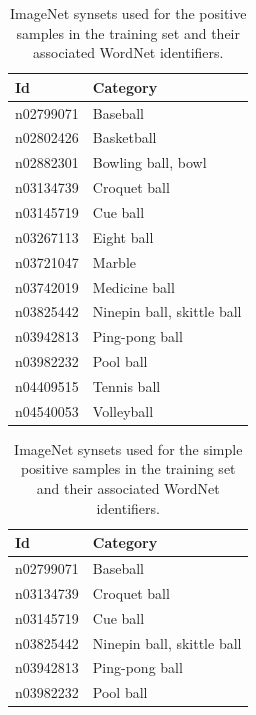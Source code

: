 \documentclass{llncs}
\begin{document}
{{			\begin{table}
				\centering
				\caption{ImageNet synsets used for the positive samples in the training set and their associated WordNet identifiers.}
				\label{tab:positive_samples}
				\begin{tabularx}{\textwidth}{@{}lX@{}}
					\toprule
					\textbf{Id} & \textbf{Category} \\
					\midrule
						n02799071 & Baseball \\
						n02802426 & Basketball \\
						n02882301 & Bowling ball, bowl \\
						n03134739 & Croquet ball \\
						n03145719 & Cue ball \\
						n03267113 & Eight ball \\
						n03721047 & Marble \\
						n03742019 & Medicine ball \\
						n03825442 & Ninepin ball, skittle ball \\
						n03942813 & Ping-pong ball \\
						n03982232 & Pool ball \\
						n04409515 & Tennis ball \\
						n04540053 & Volleyball \\
					\bottomrule
				\end{tabularx}
			\end{table}

			\begin{table}
				\centering
				\caption{ImageNet synsets used for the simple positive samples in the training set and their associated WordNet identifiers.}
				\label{tab:positive_samples_simple}
				\begin{tabularx}{\textwidth}{@{}lX@{}}
					\toprule
					\textbf{Id} & \textbf{Category} \\
					\midrule
						n02799071 & Baseball \\
						n03134739 & Croquet ball \\
						n03145719 & Cue ball \\
						n03825442 & Ninepin ball, skittle ball \\
						n03942813 & Ping-pong ball \\
						n03982232 & Pool ball \\
					\bottomrule
				\end{tabularx}
			\end{table}

}}
\end{document}

